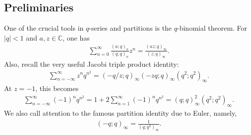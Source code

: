 \documentclass[12pt,reqno]{amsart}
\renewcommand{\(}{\left\(}
\renewcommand{\)}{\right\)}
\renewcommand{\[}{\left\[}
\renewcommand{\]}{\right\]}
\numberwithin{equation}{section}
\theoremstyle{plain}
\begin{document}
\subsection{Preliminaries}
One of the crucial tools in $q$-series and partitions is the $q$-binomial theorem. For $|q|<1$ and $ a,z \in \mathbb{C}$, one has
\begin{align}
\sum_{n=0}^{\infty} \frac{(a;q)_n}{(q;q)_n} z^n = \frac{(az;q)_{\infty}}{(z;q)_{\infty}}\label{q-binomial}.
\end{align}
Also, recall the very useful Jacobi triple product identity:
\begin{align*}
\sum_{n=-\infty}^{\infty} z^nq^{n^2} =(-q/z;q)_{\infty}(-zq;q)_{\infty}(q^2;q^2)_{\infty}. %
\end{align*}
At $z=-1$, this becomes
\begin{align}
\sum_{n=-\infty}^{\infty} (-1)^nq^{n^2} = 1+2\sum_{n=1}^{\infty} (-1)^nq^{n^2} =(q;q)^2_{\infty}(q^2;q^2)_{\infty}\label{JTPI}.
\end{align}
We also call attention to the famous partition identity due to Euler, namely,
\begin{align}
(-q;q)_{\infty}=\frac{1}{(q;q^2)_{\infty}}.\label{euler}
\end{align}
\end{document}
